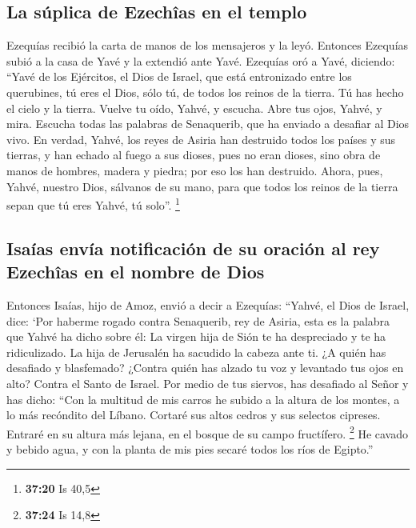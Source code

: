 \hypertarget{la-suxfaplica-de-ezechuxeeas-en-el-templo}{%
\subsection{La súplica de Ezechîas en el
templo}\label{la-suxfaplica-de-ezechuxeeas-en-el-templo}}

 Ezequías recibió la carta de manos de los mensajeros y
la leyó. Entonces Ezequías subió a la casa de Yavé y la extendió ante
Yavé.  Ezequías oró a Yavé, diciendo: 
``Yavé de los Ejércitos, el Dios de Israel, que está entronizado entre
los querubines, tú eres el Dios, sólo tú, de todos los reinos de la
tierra. Tú has hecho el cielo y la tierra.  Vuelve tu
oído, Yahvé, y escucha. Abre tus ojos, Yahvé, y mira. Escucha todas las
palabras de Senaquerib, que ha enviado a desafiar al Dios vivo.
 En verdad, Yahvé, los reyes de Asiria han destruido
todos los países y sus tierras,  y han echado al fuego a
sus dioses, pues no eran dioses, sino obra de manos de hombres, madera y
piedra; por eso los han destruido.  Ahora, pues, Yahvé,
nuestro Dios, sálvanos de su mano, para que todos los reinos de la
tierra sepan que tú eres Yahvé, tú solo''. \footnote{\textbf{37:20} Is
  40,5}

\hypertarget{isauxedas-envuxeda-notificaciuxf3n-de-su-oraciuxf3n-al-rey-ezechuxeeas-en-el-nombre-de-dios}{%
\subsection{Isaías envía notificación de su oración al rey Ezechîas en
el nombre de
Dios}\label{isauxedas-envuxeda-notificaciuxf3n-de-su-oraciuxf3n-al-rey-ezechuxeeas-en-el-nombre-de-dios}}

 Entonces Isaías, hijo de Amoz, envió a decir a Ezequías:
``Yahvé, el Dios de Israel, dice: `Por haberme rogado contra Senaquerib,
rey de Asiria,  esta es la palabra que Yahvé ha dicho
sobre él: La virgen hija de Sión te ha despreciado y te ha ridiculizado.
La hija de Jerusalén ha sacudido la cabeza ante ti.  ¿A
quién has desafiado y blasfemado? ¿Contra quién has alzado tu voz y
levantado tus ojos en alto? Contra el Santo de Israel. 
Por medio de tus siervos, has desafiado al Señor y has dicho: ``Con la
multitud de mis carros he subido a la altura de los montes, a lo más
recóndito del Líbano. Cortaré sus altos cedros y sus selectos cipreses.
Entraré en su altura más lejana, en el bosque de su campo fructífero.
\footnote{\textbf{37:24} Is 14,8}  He cavado y bebido
agua, y con la planta de mis pies secaré todos los ríos de Egipto.''

